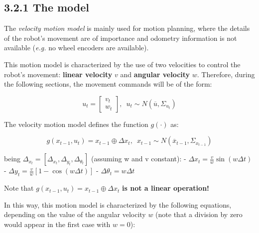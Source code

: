 \documentclass[11pt]{article}
\begin{document}
    \hypertarget{the-model}{%
\subsection{3.2.1 The model}\label{the-model}}

The \emph{velocity motion model} is mainly used for motion planning,
where the details of the robot's movement are of importance and odometry
information is not available (\emph{e.g.} no wheel encoders are
available).

This motion model is characterized by the use of two velocities to
control the robot's movement: \textbf{linear velocity} \(v\) and
\textbf{angular velocity} \(w\). Therefore, during the following
sections, the movement commands will be of the form:

\[u_t = \begin{bmatrix} v_t \\ w_t \end{bmatrix}, \, \, \, u_t \sim N(\overline{u},\Sigma_{u_t})\]

The velocity motion model defines the function \(g(\cdot)\) as:

\[g(x_{t-1},u_t)=x_{t-1} \oplus \Delta x_t, \, \, \,
x_{t-1}\sim N (\overline{x}_{t-1},\Sigma_{x_{t-1}})\]

being \(\Delta_{x_t}=[\Delta_{x_t}, \Delta_{y_t}, \Delta_{\theta_t}]\)
(assuming w and v constant): -
\(\Delta x_t = \frac{v}{w} \sin(w\Delta t)\) -
\(\Delta y_t = \frac{v}{w} [1-\cos(w\Delta t)]\) -
\(\Delta \theta_t = w\Delta t\)

Note that \(g(x_{t-1},u_t)=x_{t-1} \oplus \Delta x_t\) \textbf{is not a
linear operation!}

In this way, this motion model is characterized by the following
equations, depending on the value of the angular velocity \(w\) (note
that a division by zero would appear in the first case with \(w=0\)):
\end{document}
